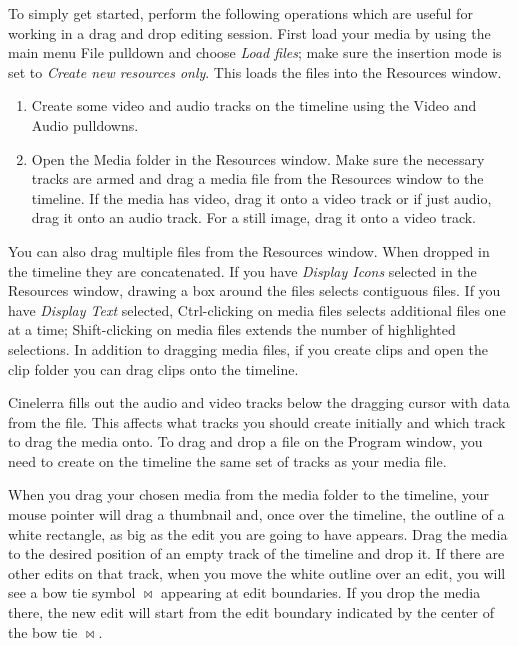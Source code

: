 To simply get started, perform the following operations which are useful for working in a drag and drop editing session.  First load your media by using the main menu File pulldown and choose \textit{Load files}; make sure the insertion mode is set to \textit{Create new resources only}.  This loads the files into the Resources window.

\begin{enumerate}
    \item Create some video and audio tracks on the timeline using the Video and Audio pulldowns.
    \item Open the Media folder in the Resources window.  Make sure the necessary tracks are armed and drag
    a media file from the Resources window to the timeline. If the media has video, drag it onto a video 
    track or if just audio, drag it onto an audio track. For a still image, drag it onto a video track.
\end{enumerate}

\noindent You can also drag multiple files from the Resources window. When dropped in the timeline they are concatenated. If you have \textit{Display Icons} selected in the Resources window, drawing a box around the files selects contiguous files. If you have \textit{Display Text} selected, Ctrl-clicking on media files selects additional files one at a time; Shift-clicking on media files extends the number of highlighted selections.  In addition to dragging media files, if you create clips and open the clip folder you can drag
clips onto the timeline.

Cinelerra fills out the audio and video tracks below the dragging cursor with data from the file. This affects what tracks you should create initially and which track to drag the media onto. To drag and drop a file on the Program window, you need to create on the timeline the same set of tracks as your media file.

When you drag your chosen media from the media folder to the timeline, your mouse pointer will drag a thumbnail and, once over the timeline, the outline of a white rectangle, as big as the edit you are going to have appears.  Drag the media to the desired position of an empty track of the timeline and drop it.  If there are other edits on that track, when you move the white outline over an edit, you will see a bow tie symbol $\bowtie$ appearing at edit boundaries. If you drop the media there, the new edit will start from the edit boundary indicated by the center of the bow tie $\bowtie$.

